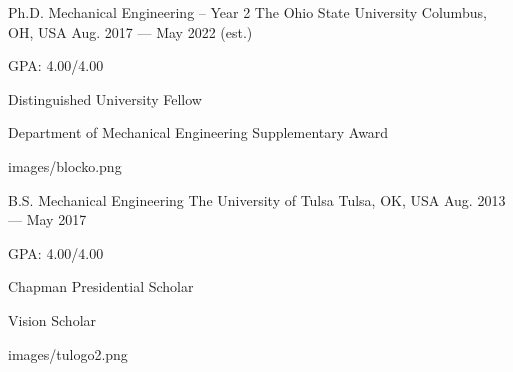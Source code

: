 

\begin{cventries}
	
	\cveducation
	{Ph.D. Mechanical Engineering -- Year 2} %
	{The Ohio State University} %
	{Columbus, OH, USA} %
	{Aug. 2017 --- May 2022 (est.)} %
	{
		\begin{cvitems} %
			\item {GPA: 4.00/4.00}
			\item {Distinguished University Fellow}
			\item {Department of Mechanical Engineering Supplementary Award}
		\end{cvitems}
	}
	{images/blocko.png}

	\cveducation
    {B.S. Mechanical Engineering} %
    {The University of Tulsa} %
    {Tulsa, OK, USA} %
    {Aug. 2013 --- May 2017} %
    {
      \begin{cvitems} %
      	\item {GPA: 4.00/4.00}
        \item {Chapman Presidential Scholar}
        \item {Vision Scholar}
      \end{cvitems}
    }
	{images/tulogo2.png}
\end{cventries}
